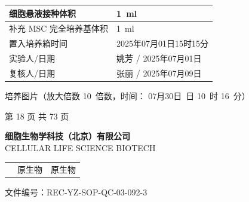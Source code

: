 \documentclass[UTF8,10pt,a4paper,fontset=fandol]{ctexart}
\newcommand{\fieldvalue}[1]{#1}
\newcommand{\handwritten}[1]{#1}
\begin{document}
\begin{tabularx}{\textwidth}{|X|X|}
\hline
细胞悬液接种体积 &
\fieldvalue{\handwritten{1}}\ ml \\ \hline
补充 MSC 完全培养基体积 &
\fieldvalue{\handwritten{1}}\ ml \\ \hline
置入培养箱时间 &
\fieldvalue{\handwritten{2025年07月01日15时15分}} \\ \hline
实验人/日期 &
\fieldvalue{\handwritten{姚芳}} /
\fieldvalue{\handwritten{2025年07月01日}} \\ \hline
复核人/日期 &
\fieldvalue{\handwritten{张丽}} /
\fieldvalue{\handwritten{2025年07月09日}} \\ \hline
\end{tabularx}

\begin{center}
培养图片（放大倍数
\fieldvalue{\handwritten{10}}\ 倍数，时间：
\fieldvalue{\handwritten{07月30日}}\ 日
\fieldvalue{\handwritten{10}}\ 时
\fieldvalue{\handwritten{16}}\ 分）
\end{center}

\begin{center}
第 18 页 共 73 页
\end{center}

\newpage

\begin{center}
\small
\textbf{细胞生物学科技（北京）有限公司}\\
CELLULAR LIFE SCIENCE BIOTECH

\vspace{2mm}
\begin{tabularx}{\textwidth}{@{}lXr@{}}
 & \centering 原生物 & 原生物\\
\end{tabularx}

\vspace{2mm}
文件编号：REC-YZ-SOP-QC-03-092-3
\end{center}
\end{document}

